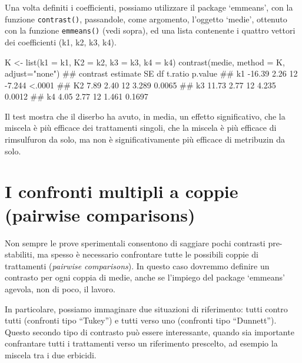 \documentclass[a4paper,12pt,oneside]{book}
\newenvironment{Shaded}{\begin{snugshade}}{\end{snugshade}}
\newcommand{\StringTok}[1]{#1}
\newcommand{\DocumentationTok}[1]{#1}
\newcommand{\OtherTok}[1]{#1}
\newcommand{\FunctionTok}[1]{#1}
\newcommand{\AttributeTok}[1]{#1}
\newcommand{\NormalTok}[1]{#1}
\begin{document}
Una volta definiti i coefficienti, possiamo utilizzare il package `emmeans', con la funzione \texttt{contrast()}, passandole, come argomento, l'oggetto `medie', ottenuto con la funzione \texttt{emmeans()} (vedi sopra), ed una lista contenente i quattro vettori dei coefficienti (k1, k2, k3, k4).

\small

\begin{Shaded}
\begin{Highlighting}[]
\NormalTok{K }\OtherTok{\textless{}{-}} \FunctionTok{list}\NormalTok{(}\AttributeTok{k1 =}\NormalTok{ k1, }\AttributeTok{K2 =}\NormalTok{ k2, }\AttributeTok{k3 =}\NormalTok{ k3, }\AttributeTok{k4 =}\NormalTok{ k4)}
\FunctionTok{contrast}\NormalTok{(medie, }\AttributeTok{method =}\NormalTok{ K, }\AttributeTok{adjust=}\StringTok{"none"}\NormalTok{)}
\DocumentationTok{\#\#  contrast estimate   SE df t.ratio p.value}
\DocumentationTok{\#\#  k1         {-}16.39 2.26 12  {-}7.244  \textless{}.0001}
\DocumentationTok{\#\#  K2           7.89 2.40 12   3.289  0.0065}
\DocumentationTok{\#\#  k3          11.73 2.77 12   4.235  0.0012}
\DocumentationTok{\#\#  k4           4.05 2.77 12   1.461  0.1697}
\end{Highlighting}
\end{Shaded}

\normalsize

Il test mostra che il diserbo ha avuto, in media, un effetto significativo, che la miscela è più efficace dei trattamenti singoli, che la miscela è più efficace di rimsulfuron da solo, ma non è significativamente più efficace di metribuzin da solo.

\hypertarget{i-confronti-multipli-a-coppie-pairwise-comparisons}{%
\section{I confronti multipli a coppie (pairwise comparisons)}\label{i-confronti-multipli-a-coppie-pairwise-comparisons}}

Non sempre le prove sperimentali consentono di saggiare pochi contrasti pre-stabiliti, ma spesso è necessario confrontare tutte le possibili coppie di trattamenti (\emph{pairwise comparisons}). In questo caso dovremmo definire un contrasto per ogni coppia di medie, anche se l'impiego del package `emmeans' agevola, non di poco, il lavoro.

In particolare, possiamo immaginare due situazioni di riferimento: tutti contro tutti (confronti tipo ``Tukey'') e tutti verso uno (confronti tipo ``Dunnett''). Questo secondo tipo di contrasto può essere interessante, quando sia importante confrantare tutti i trattamenti verso un riferimento prescelto, ad esempio la miscela tra i due erbicidi.
\end{document}
